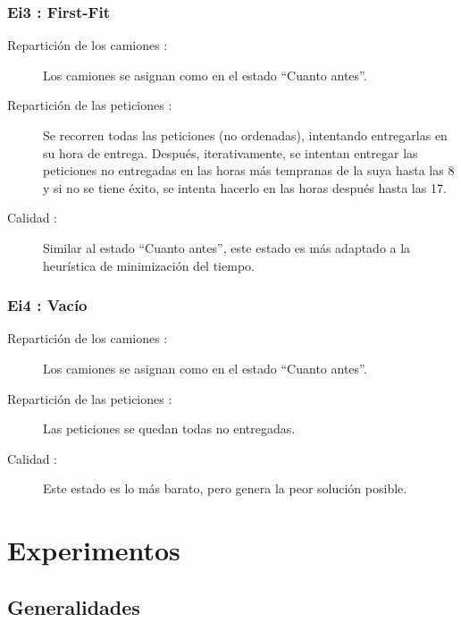\documentclass{article}
\begin{document}
\subsubsection{Ei3 : First-Fit}

\begin{description}
\item[Repartición de los camiones :] Los camiones se asignan como en el estado
``Cuanto antes''.
\item[Repartición de las peticiones :] Se recorren todas las peticiones (no
ordenadas), intentando entregarlas en su hora de entrega. Después,
iterativamente, se intentan entregar las peticiones no entregadas en las horas
más tempranas de la suya hasta las 8 y si no se tiene éxito, se intenta hacerlo
en las horas después hasta las 17.
\item[Calidad :] Similar al estado ``Cuanto antes'', este estado es más adaptado
a la heurística de minimización del tiempo.
\end{description}

\subsubsection{Ei4 : Vacío}

\begin{description}
\item[Repartición de los camiones :] Los camiones se asignan como en el estado
``Cuanto antes''.
\item[Repartición de las peticiones :] Las peticiones se quedan todas no
entregadas.
\item[Calidad :] Este estado es lo más barato, pero genera la peor solución
posible.
\end{description}

\newpage

\section{Experimentos}


\subsection{Generalidades}
\end{document}
